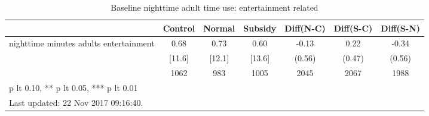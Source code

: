 \begin{table}[htbp]\centering
\def\sym#1{\ifmmode^{#1}\else\(^{#1}\)\fi}
\caption{Baseline nighttime adult time use: entertainment related \label{tab:"balance"}}
\begin{tabular*}{1\hsize}{@{\hskip\tabcolsep\extracolsep\fill}l*{1}{cccccc}}
\toprule
                                &  Control&   Normal&  Subsidy&Diff(N-C)         &Diff(S-C)         &Diff(S-N)         \\
\midrule
nighttime minutes adults entertainment&     0.68&     0.73&     0.60&    -0.13         &     0.22         &    -0.34         \\
                                &   [11.6]&   [12.1]&   [13.6]&   (0.56)         &   (0.47)         &   (0.56)         \\
                                &     1062&      983&     1005&     2045         &     2067         &     1988         \\
\bottomrule
\multicolumn{7}{l}{\footnotesize * p lt 0.10, ** p lt 0.05, *** p lt 0.01}\\
\multicolumn{7}{l}{\footnotesize Last updated: 22 Nov 2017 09:16:40.}\\
\end{tabular*}
\end{table}

